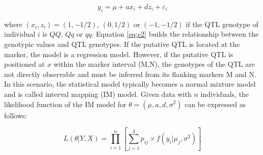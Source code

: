 \begin{equation} 
	y_{i}=\mu+ax_{i}+dz_{i}+\varepsilon_{i} \label{eq:e2}
\end{equation} 

\noindent where $\left(x_{i},z_{i}\right)=\left(1,-1/2\right)$, $\left(0,1/2\right)$ or $\left(-1,-1/2\right)$ if the QTL genotype of individual $i$ is $QQ$, $Qq$ or $qq$. Equation \ref{eq:e2} builds the relationship between the genotypic values and QTL genotypes. If the putative QTL is located at the marker, the model is a regression model. However, if the putative QTL is positioned at $x$ within the marker interval (M,N), the genotypes of the QTL are not directly observable and must be inferred from its flanking markers M and N. In this scenario, the statistical model typically becomes a normal mixture model and is called interval mapping (IM) model. Given data with $n$ individuals, the likelihood function of the IM model for $\theta=\left(\mu,a,d,\sigma^{2}\right)$ can be expressed as follows: 

\begin{equation} 
	L\left(\theta|Y,X\right)=\prod_{i=1}^{n}\left[\sum_{j=1}^{3}p_{ij}\times f\left(y_{i}|\mu_{j},\sigma^{2}\right)\right] \label{eq:e3}
\end{equation} 

